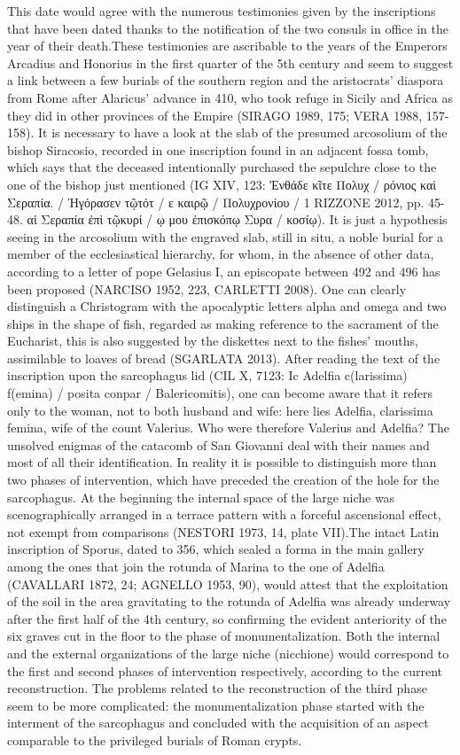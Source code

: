 \documentclass[amsthm,ebook]{saparticle}
\begin{document}
This date would agree with the numerous testimonies given by the inscriptions that have been dated thanks to the notification of the two consuls in office in the year of their death.These testimonies are ascribable to the years of the Emperors Arcadius and Honorius in the first quarter of the 5th century and seem to suggest a link between a few burials of the southern region and the aristocrats’ diaspora from Rome after Alaricus’ advance in 410, who took refuge in Sicily and Africa as they did in other provinces of the Empire (SIRAGO 1989, 175; VERA 1988, 157-158). It is necessary to have a look at the slab of the presumed arcosolium of the bishop Siracosio, recorded in one inscription found in an adjacent fossa tomb, which says that the deceased intentionally purchased the sepulchre close to the one of the bishop just mentioned (IG XIV, 123: Ἐνθάδε κῖτε Πολυχ / ρόνιος καὶ Σεραπία. / Ἠγόρασεν τῷτότ / ε καιρῷ / Πολυχρονίου /
 1 RIZZONE 2012, pp. 45-48.
αἱ Σεραπία ἐπὶ τῷκυρί / ῳ μου ἐπισκόπῳ Συρα / κοσίῳ). It is just a hypothesis seeing in the arcosolium with the engraved slab, still in situ, a noble burial for a member of the ecclesiastical hierarchy, for whom, in the absence of other data, according to a letter of pope Gelasius I, an episcopate between 492 and 496 has been proposed (NARCISO 1952, 223, CARLETTI 2008). One can clearly distinguish a Christogram with the apocalyptic letters alpha and omega and two ships in the shape of fish, regarded as making reference to the sacrament of the Eucharist, this is also suggested by the diskettes next to the fishes’ mouths, assimilable to loaves of bread (SGARLATA 2013).
After reading the text of the inscription upon the sarcophagus lid (CIL X, 7123: Ic Adelfia c(larissima) f(emina) / posita conpar / Balericomitis), one can become aware that it refers only to the woman, not to both husband and wife: here lies Adelfia, clarissima femina, wife of the count Valerius. Who were therefore Valerius and Adelfia? The unsolved enigmas of the catacomb of San Giovanni deal with their names and most of all their identification. In reality it is possible to distinguish more than two phases of intervention, which have preceded the creation of the hole for the sarcophagus. At the beginning the internal space of the large niche was scenographically arranged in a terrace pattern with a forceful ascensional effect, not exempt from comparisons (NESTORI 1973, 14, plate VII).The intact Latin inscription of Sporus, dated to 356, which sealed a forma in the main gallery among the ones that join the rotunda of Marina to the one of Adelfia (CAVALLARI 1872, 24; AGNELLO 1953, 90), would attest that the exploitation of the soil in the area gravitating to the rotunda of Adelfia was already underway after the first half of the 4th century, so confirming the evident anteriority of the six graves cut in the floor to the phase of monumentalization. Both the internal and the external organizations of the large niche (nicchione) would correspond to the first and second phases of intervention respectively, according to the current reconstruction. The problems related to the reconstruction of the third phase seem to be more complicated: the monumentalization phase started with the interment of the sarcophagus and concluded with the acquisition of an aspect comparable to the privileged burials of Roman crypts.
\end{document}
